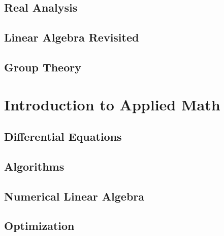 \documentclass[oneside,openany]{book}
\theoremstyle{definition}
\begin{document}
\chapter{Real Analysis}


\chapter{Linear Algebra Revisited}


\chapter{Group Theory}



\part{Introduction to Applied Math}

\chapter{Differential Equations}


\chapter{Algorithms}


\chapter{Numerical Linear Algebra}


\chapter{Optimization}


\end{document}
